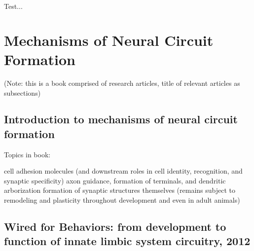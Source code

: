 \documentclass[11pt, a4paper, oneside]{article}   	%
\begin{document}
Test...

\section{Mechanisms of Neural Circuit Formation \cite{Weiner2015}}
(Note: this is a book comprised of research articles, title of relevant articles as subsections)


\subsection{Introduction to mechanisms of neural circuit formation}
Topics in book:
\begin{outline}
\point cell adhesion molecules (and downstream roles in cell identity, recognition, and synaptic specificity)
\point axon guidance, formation of terminals, and dendritic arborization
\point formation of synaptic structures themselves (remains subject to remodeling and plasticity throughout development and even in adult animals)
\end{outline}

\subsection{Wired for Behaviors: from development to function of innate limbic system circuitry, 2012}
\label{MNCF:wiredforbehaviors}
\end{document}
